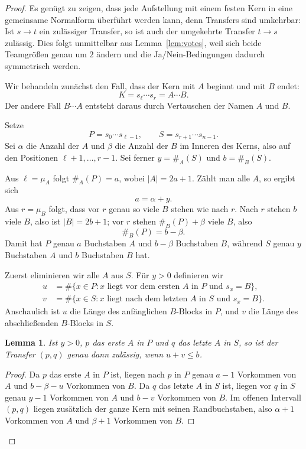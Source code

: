 \documentclass[11pt,a4paper]{article}
\newtheorem{lemma}[theorem]{Lemma}
\begin{document}
\begin{proof}
Es gen\"ugt zu zeigen, dass jede Aufstellung mit einem festen Kern in
eine gemeinsame Normalform \"uberf\"uhrt werden kann, denn Transfers
sind umkehrbar: Ist $s\to t$ ein zul\"assiger Transfer, so ist auch
der umgekehrte Transfer $t\to s$ zul\"assig.  Dies folgt unmittelbar
aus Lemma~\ref{lem:votes}, weil sich beide Teamgr\"o\ss en genau um $2$
\"andern und die Ja/Nein-Bedingungen dadurch symmetrisch werden.

Wir behandeln zun\"achst den Fall, dass der Kern mit $A$ beginnt und
mit $B$ endet:
\[
K=s_\ell\cdots s_r=A\cdots B.
\]
Der andere Fall $B\cdots A$ entsteht daraus durch Vertauschen der
Namen $A$ und $B$.

Setze
\[
P=s_0\cdots s_{\ell-1},\qquad
S=s_{r+1}\cdots s_{n-1}.
\]
Sei $\alpha$ die Anzahl der $A$ und $\beta$ die Anzahl der $B$ im
Inneren des Kerns, also auf den Positionen $\ell+1,\dots,r-1$.  Sei
ferner $y=\#_A(S)$ und $b=\#_B(S)$.

Aus $\ell=\mu_A$ folgt $\#_A(P)=a$, wobei $|A|=2a+1$.  Z\"ahlt man
alle $A$, so ergibt sich
\[
a=\alpha+y.
\]
Aus $r=\mu_B$ folgt, dass vor $r$ genau so viele $B$ stehen wie nach
$r$.  Nach $r$ stehen $b$ viele $B$, also ist $|B|=2b+1$; vor $r$
stehen $\#_B(P)+\beta$ viele $B$, also
\[
\#_B(P)=b-\beta.
\]
Damit hat $P$ genau $a$ Buchstaben $A$ und $b-\beta$ Buchstaben $B$,
w\"ahrend $S$ genau $y$ Buchstaben $A$ und $b$ Buchstaben $B$ hat.

Zuerst eliminieren wir alle $A$ aus $S$.  F\"ur $y>0$ definieren wir
\begin{align*}
u&=\#\{x\in P:\text{$x$ liegt vor dem ersten $A$ in $P$ und }
s_x=B\},\\
v&=\#\{x\in S:\text{$x$ liegt nach dem letzten $A$ in $S$ und }
s_x=B\}.
\end{align*}
Anschaulich ist $u$ die L\"ange des anf\"anglichen $B$-Blocks in $P$,
und $v$ die L\"ange des abschlie\ss enden $B$-Blocks in $S$.

\begin{lemma}
\label{lem:A-criterion}
Ist $y>0$, $p$ das erste $A$ in $P$ und $q$ das letzte $A$ in $S$,
so ist der Transfer $(p,q)$ genau dann zul\"assig, wenn
$u+v\le b$.
\end{lemma}

\begin{proof}
Da $p$ das erste $A$ in $P$ ist, liegen nach $p$ in $P$ genau $a-1$
Vorkommen von $A$ und $b-\beta-u$ Vorkommen von $B$.  Da $q$ das
letzte $A$ in $S$ ist, liegen vor $q$ in $S$ genau $y-1$ Vorkommen
von $A$ und $b-v$ Vorkommen von $B$.  Im offenen Intervall $(p,q)$
liegen zus\"atzlich der ganze Kern mit seinen Randbuchstaben, also
$\alpha+1$ Vorkommen von $A$ und $\beta+1$ Vorkommen von $B$.


\end{proof}
\end{proof}
\end{document}
